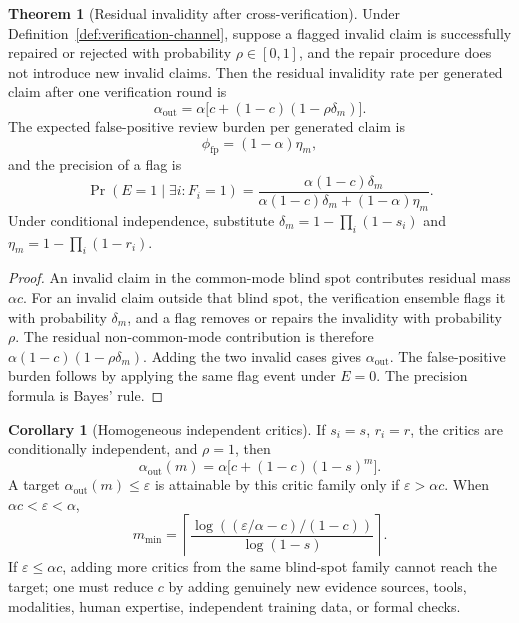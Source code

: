 \documentclass[12pt]{article}
\theoremstyle{definition}
\newtheorem{theorem}{Theorem}[section]
\newtheorem{corollary}{Corollary}[theorem]
\begin{document}
\begin{theorem}[Residual invalidity after cross-verification]
\label{thm:verification-channel}
Under Definition~\ref{def:verification-channel}, suppose a flagged invalid claim
is successfully repaired or rejected with probability $\rho\in[0,1]$, and the
repair procedure does not introduce new invalid claims.  Then the residual
invalidity rate per generated claim after one verification round is
\[
\alpha_{\mathrm{out}}
=
\alpha\bigl[c+(1-c)(1-\rho\delta_m)\bigr].
\]
The expected false-positive review burden per generated claim is
\[
\phi_{\mathrm{fp}}=(1-\alpha)\eta_m,
\]
and the precision of a flag is
\[
\Pr(E=1\mid \exists i:F_i=1)
=
\frac{\alpha(1-c)\delta_m}
{\alpha(1-c)\delta_m+(1-\alpha)\eta_m}.
\]
Under conditional independence, substitute
$\delta_m=1-\prod_i(1-s_i)$ and $\eta_m=1-\prod_i(1-r_i)$.
\end{theorem}

\begin{proof}
An invalid claim in the common-mode blind spot contributes residual mass
$\alpha c$.  For an invalid claim outside that blind spot, the verification
ensemble flags it with probability $\delta_m$, and a flag removes or repairs the
invalidity with probability $\rho$.  The residual non-common-mode contribution
is therefore $\alpha(1-c)(1-\rho\delta_m)$.  Adding the two invalid cases gives
$\alpha_{\mathrm{out}}$.  The false-positive burden follows by applying the
same flag event under $E=0$.  The precision formula is Bayes' rule.
\end{proof}

\begin{corollary}[Homogeneous independent critics]
\label{cor:homogeneous-critics}
If $s_i=s$, $r_i=r$, the critics are conditionally independent, and $\rho=1$,
then
\[
\alpha_{\mathrm{out}}(m)=\alpha\bigl[c+(1-c)(1-s)^m\bigr].
\]
A target $\alpha_{\mathrm{out}}(m)\le\varepsilon$ is attainable by this critic
family only if $\varepsilon>\alpha c$.  When
$\alpha c<\varepsilon<\alpha$,
\[
 m_{\min}
 =
 \left\lceil
 \frac{\log\left((\varepsilon/\alpha-c)/(1-c)\right)}{\log(1-s)}
 \right\rceil.
\]
If $\varepsilon\le\alpha c$, adding more critics from the same blind-spot family
cannot reach the target; one must reduce $c$ by adding genuinely new evidence
sources, tools, modalities, human expertise, independent training data, or
formal checks.
\end{corollary}
\end{document}
